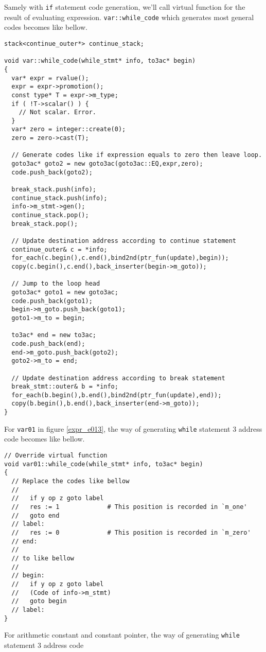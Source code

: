 Samely with {\tt{if}} statement code generation,
we'll call virtual function for the result of evaluating
expression. 
{\tt{var::while\_code}} which generates most general codes
becomes like bellow.
\begin{verbatim}
stack<continue_outer*> continue_stack;

void var::while_code(while_stmt* info, to3ac* begin)
{
  var* expr = rvalue();
  expr = expr->promotion();
  const type* T = expr->m_type;
  if ( !T->scalar() ) {
    // Not scalar. Error.
  }
  var* zero = integer::create(0);
  zero = zero->cast(T);

  // Generate codes like if expression equals to zero then leave loop.
  goto3ac* goto2 = new goto3ac(goto3ac::EQ,expr,zero);
  code.push_back(goto2);

  break_stack.push(info);
  continue_stack.push(info);
  info->m_stmt->gen();
  continue_stack.pop();
  break_stack.pop();

  // Update destination address according to continue statement
  continue_outer& c = *info;
  for_each(c.begin(),c.end(),bind2nd(ptr_fun(update),begin));
  copy(c.begin(),c.end(),back_inserter(begin->m_goto));

  // Jump to the loop head
  goto3ac* goto1 = new goto3ac;
  code.push_back(goto1);
  begin->m_goto.push_back(goto1);
  goto1->m_to = begin;

  to3ac* end = new to3ac;
  code.push_back(end);
  end->m_goto.push_back(goto2);
  goto2->m_to = end;

  // Update destination address according to break statement
  break_stmt::outer& b = *info;
  for_each(b.begin(),b.end(),bind2nd(ptr_fun(update),end));
  copy(b.begin(),b.end(),back_inserter(end->m_goto));
}
\end{verbatim}
For {\tt{var01}} in figure \ref{expr_e013},
the way of generating {\tt{while}} statement 3 address code
becomes like bellow.
\begin{verbatim}
// Override virtual function
void var01::while_code(while_stmt* info, to3ac* begin)
{
  // Replace the codes like bellow
  //
  //   if y op z goto label
  //   res := 1             # This position is recorded in `m_one'
  //   goto end
  // label:
  //   res := 0             # This position is recorded in `m_zero'
  // end:
  //
  // to like bellow
  //
  // begin:
  //   if y op z goto label
  //   (Code of info->m_stmt)
  //   goto begin
  // label:
}
\end{verbatim}
For arithmetic constant and constant pointer,
the way of generating {\tt{while}} statement 3 address code
